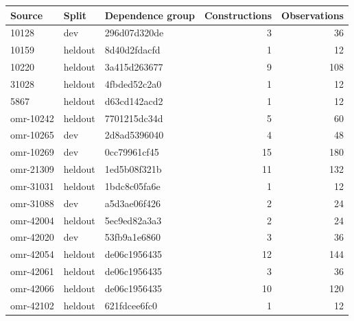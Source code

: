\begin{tabular}{@{}lllrr@{}}
\toprule
Source & Split & Dependence group & Constructions & Observations\\
\midrule
10128 & dev & 296d07d320de & 3 & 36\\
10159 & heldout & 8d40d2fdacfd & 1 & 12\\
10220 & heldout & 3a415d263677 & 9 & 108\\
31028 & heldout & 4fbded52c2a0 & 1 & 12\\
5867 & heldout & d63cd142acd2 & 1 & 12\\
omr-10242 & heldout & 7701215dc34d & 5 & 60\\
omr-10265 & dev & 2d8ad5396040 & 4 & 48\\
omr-10269 & dev & 0cc79961cf45 & 15 & 180\\
omr-21309 & heldout & 1ed5b08f321b & 11 & 132\\
omr-31031 & heldout & 1bdc8c05fa6e & 1 & 12\\
omr-31088 & dev & a5d3ae06f426 & 2 & 24\\
omr-42004 & heldout & 5ec9ed82a3a3 & 2 & 24\\
omr-42020 & dev & 53fb9a1e6860 & 3 & 36\\
omr-42054 & heldout & de06c1956435 & 12 & 144\\
omr-42061 & heldout & de06c1956435 & 3 & 36\\
omr-42066 & heldout & de06c1956435 & 10 & 120\\
omr-42102 & heldout & 621fdcee6fc0 & 1 & 12\\
\bottomrule
\end{tabular}
